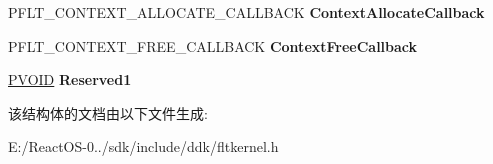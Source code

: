 \begin{DoxyCompactItemize}
P\+F\+L\+T\+\_\+\+C\+O\+N\+T\+E\+X\+T\+\_\+\+A\+L\+L\+O\+C\+A\+T\+E\+\_\+\+C\+A\+L\+L\+B\+A\+CK {\bfseries Context\+Allocate\+Callback}
\item 
\mbox{\label{struct___f_l_t___c_o_n_t_e_x_t___r_e_g_i_s_t_r_a_t_i_o_n_aa25a40373128164d4391db4211100c16}} 
P\+F\+L\+T\+\_\+\+C\+O\+N\+T\+E\+X\+T\+\_\+\+F\+R\+E\+E\+\_\+\+C\+A\+L\+L\+B\+A\+CK {\bfseries Context\+Free\+Callback}
\item 
\mbox{\label{struct___f_l_t___c_o_n_t_e_x_t___r_e_g_i_s_t_r_a_t_i_o_n_a8f2a461fa4458d2ed2ce3ac720ac77f0}} 
\hyperlink{interfacevoid}{P\+V\+O\+ID} {\bfseries Reserved1}
\end{DoxyCompactItemize}


该结构体的文档由以下文件生成\+:\begin{DoxyCompactItemize}
\item 
E\+:/\+React\+O\+S-\/0../sdk/include/ddk/fltkernel.\+h\end{DoxyCompactItemize}
